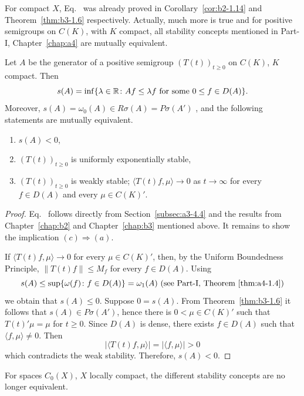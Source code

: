 For compact $X$, Eq.~ was already proved in Corollary~\ref{cor:b2-1.14} and Theorem~\ref{thm:b3-1.6} respectively. 
Actually, much more is true and for positive semigroups on $C(K)$, with $K$ compact, all stability concepts mentioned in Part-I, Chapter~\ref{chap:a4} are mutually equivalent.
\begin{theorem}\label{thm:b4-1.1}%
Let $A$ be the generator of a positive semigroup $(T(t))_{t \geq 0}$ on $C(K)$, $K$ compact. Then
\begin{equation}\label{eq:b4-1.2}
   s(A) = \inf \{\lambda \in \R \colon Af \leq \lambda f \text{ for some } 0 \leq f \in D(A)\} .
\end{equation}
Moreover, $s(A) = \omega_{0}(A) \in R\sigma(A) = P\sigma(A')$ , and the following statements are mutually equivalent.
\begin{enumerate}[\upshape (a)]
\item $s(A) < 0$,
\item $(T(t))_{t \geq 0}$ is uniformly exponentially stable,
\item $(T(t))_{t \geq 0}$ is weakly stable; \ie $\langle T(t)f,\mu \rangle \to 0$ as $t \to \infty$ for every $f \in D(A)$ and every $\mu \in C(K)'$.
\end{enumerate}
\end{theorem}
\begin{proof}
Eq.~ follows directly from Section~\ref{subsec:a3-4.4} and the results from Chapter~\ref{chap:b2} and Chapter~\ref{chap:b3} mentioned above. 
It remains to show the implication $(c) \Rightarrow (a)$.

If\/ $\langle T(t)f,\mu \rangle \to 0$ for every $\mu \in C(K)'$, then, by the Uniform Boundedness Principle, $\|T(t)f\| \leq M_f$ for every $f \in D(A)$. 
Using 
\[
s(A) \leq \sup \{\omega(f)\colon f \in D(A)\} = \omega_1(A)
\text{ (see Part-I, Theorem~\ref{thm:a4-1.4})}
\]
we obtain that $s(A) \leq 0$. 
Suppose $0 = s(A)$. 
From Theorem~\ref{thm:b3-1.6} it follows that $s(A) \in P\sigma(A')$, hence there is $0 < \mu \in C(K)'$ such that $T(t)'\mu = \mu$ for $t \geq 0$. 
Since $D(A)$ is dense, there exists $f \in D(A)$ such that $\langle f,\mu \rangle \neq 0$. 
Then 
\[
|\langle T(t)f,\mu \rangle| = |\langle f,\mu \rangle|   >  0
\]
which contradicts the weak stability. Therefore, $s(A) < 0$.
\end{proof}
For spaces $C_{0}(X)$, $X$ locally compact, the different stability concepts are no longer equivalent.
